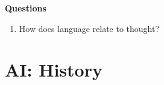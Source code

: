 \textbf{Questions}
\begin{enumerate}[itemsep=0.1cm]
    \item How does language relate to thought?
    \hfill \cite{ai/book/Artificial-Intelligence-A-Modern-Approach/Russell-Norvig}

\end{enumerate}




















\clearpage
\section{AI: History}\label{Artificial Intelligence: Introduction/AI: History}

\newcommand{\customTimeline}[1]{
    {
        \fontsize{10}{10}\selectfont
        \bfseries
        \textsc{#1}
    }
}

